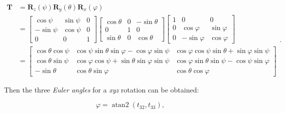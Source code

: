 \documentclass[10pt,b5paper,titlepage]{book}
\DeclareMathOperator{\atantwo}{atan2}
\begin{document}
\begin{enumerate}
        \begin{equation}
            \begin{array}{ll}
                \mathbf{T}
                &= \mathbf{R}_{z}(\psi)\mathbf{R}_{y}(\theta)\mathbf{R}_{x}(\varphi) \\
                &=
                \begin{bmatrix}
                    \cos \psi & \sin \psi & 0 \\
                    -\sin \psi & \cos \psi & 0 \\
                    0 & 0 & 1
                \end{bmatrix}
                \begin{bmatrix}
                    \cos \theta & 0 & -\sin \theta \\
                    0 & 1 & 0 \\
                    \sin \theta & 0 & \cos \theta
                \end{bmatrix}
                \begin{bmatrix}
                    1 & 0 & 0 \\
                    0 & \cos \varphi & \sin \varphi \\
                    0 & -\sin \varphi & \cos \varphi
                \end{bmatrix} \\
                &=
                \begin{bmatrix}
                    \cos \theta \cos \psi
                    & \cos \psi \sin \theta \sin \varphi - \cos \varphi \sin \psi
                    & \cos \varphi \cos \psi \sin \theta + \sin \varphi \sin \psi \\
                    \cos \theta \sin \psi
                    & \cos \varphi \cos \psi + \sin \theta \sin \varphi \sin \psi
                    & \cos \varphi \sin \theta \sin \psi - \cos \psi \sin \varphi \\
                    -\sin \theta
                    & \cos \theta \sin \varphi
                    & \cos \theta \cos \varphi
                \end{bmatrix}
            \end{array}
        .\end{equation}

        Then the three \textit{Euler angles} for a \textit{xyz} rotation
        can be obtained:

        \begin{equation}
            \varphi = \atantwo(t_{32}, t_{33})
        ,\end{equation}


\end{enumerate}
\end{document}
